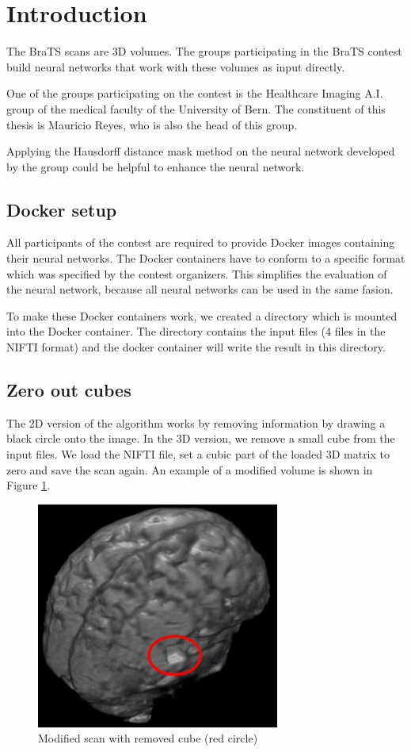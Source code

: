 \section{Introduction}
The BraTS scans are 3D volumes. The groups participating in the BraTS contest build neural networks that work with these volumes as input directly.

One of the groups participating on the contest is the Healthcare Imaging A.I. group of the medical faculty of the University of Bern. The constituent of this thesis
is Mauricio Reyes, who is also the head of this group.

Applying the Hausdorff distance mask method on the neural network developed by the group could be helpful to enhance the neural network.

\subsection{Docker setup}

All participants of the contest are required to provide Docker images containing their neural networks. The Docker containers have to conform to a specific format which
was specified by the contest organizers. This simplifies the evaluation of the neural network, because all neural networks can be used in the same fasion.

To make these Docker containers work, we created a directory which is mounted into the Docker container. The directory contains the input files (4 files in the NIFTI format)
and the docker container will write the result in this directory.

\subsection{Zero out cubes}
The 2D version of the algorithm works by removing information by drawing a black circle onto the image. In the 3D version, we remove a small cube from the input files.
We load the NIFTI file, set a cubic part of the loaded 3D matrix to zero and save the scan again. An example of a modified volume is shown in Figure \ref{brats3d_example}.

\begin{figure}[H]
\centering
\includegraphics[width=8cm]{chapters/07_brats3d/images/brain-hdm-marked.png}
\caption{Modified scan with removed cube (red circle)}
\label{brats3d_example}
\end{figure}


